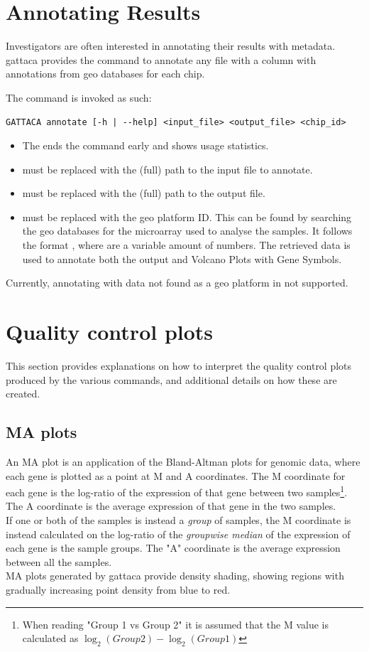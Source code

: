 \section{Annotating Results}
Investigators are often interested in annotating their results with metadata. \gls{gattaca} provides the  command to annotate any  file with a  column with annotations from \gls{geo} databases for each chip.

The command is invoked as such:
\begin{lstlisting}
GATTACA annotate [-h | --help] <input_file> <output_file> <chip_id>
\end{lstlisting}
\begin{itemize}
    \item The  ends the command early and shows usage statistics.
    \item {} must be replaced with the (full) path to the input  file to annotate.
    \item {} must be replaced with the (full) path to the output  file.
    \item {} must be replaced with the \gls{geo} platform ID. This can be found by searching the \gls{geo} databases for the microarray used to analyse the samples. It follows the format , where  are a variable amount of numbers. The retrieved data is used to annotate both the output and Volcano Plots with Gene Symbols.
\end{itemize}

Currently, annotating with data not found as a \gls{geo} platform in not supported.

\section{Quality control plots}
\label{sec:QCplots}
This section provides explanations on how to interpret the quality control plots produced by the various commands, and additional details on how these are created.

\subsection{MA plots}
\label{plot:MA}
An MA plot is an application of the Bland-Altman plots for genomic data, where each gene is plotted as a point at M and A coordinates. The M coordinate for each gene is the log-ratio of the expression of that gene between two samples\footnote{When reading "Group 1 vs Group 2" it is assumed that the M value is calculated as $\log_2(Group 2) - \log_2(Group 1)$}. The A coordinate is the average expression of that gene in the two samples.\\
If one or both of the samples is instead a \textit{group} of samples, the M coordinate is instead calculated on the log-ratio of the \textit{groupwise median} of the expression of each gene is the sample groups. The "A" coordinate is the average expression between all the samples.\\
MA plots generated by \gls{gattaca} provide density shading, showing regions with gradually increasing point density from blue to red.

